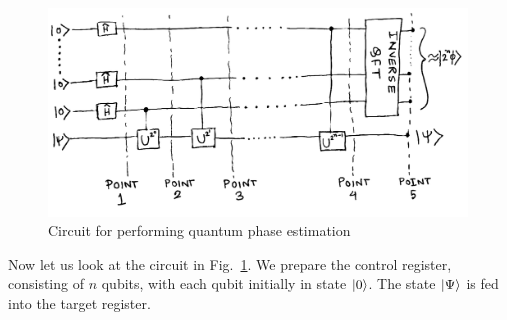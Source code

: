 \documentclass[12pt,oneside]{book}
\begin{document}
\begin{figure}
    \centering
\includegraphics[width=0.99\textwidth]{QPE.png}
    \caption{Circuit for performing quantum phase estimation}
    \label{QPE_circuit}
\end{figure}

Now let us look at the circuit in Fig.~\ref{QPE_circuit}. We prepare the control register, consisting of $n$ qubits, with each qubit initially in state $\ket{0}$. The state $\ket{\Psi}$ is fed into the target register.
\end{document}
